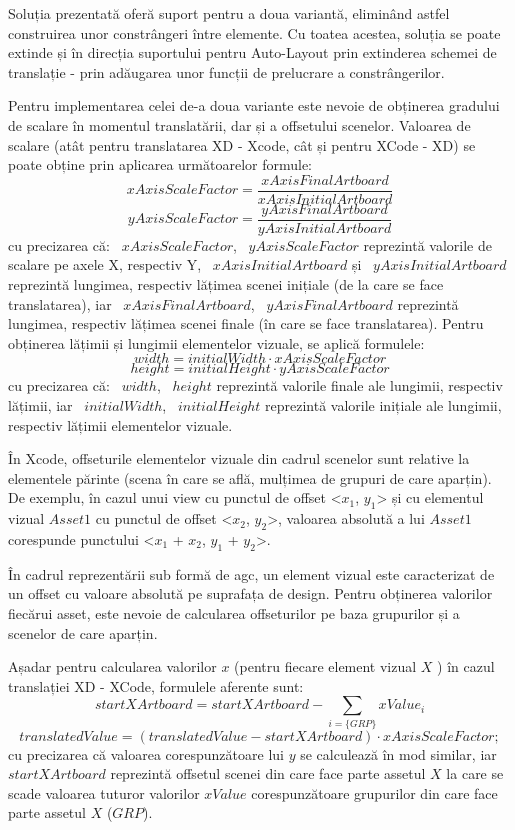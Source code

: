 Soluția prezentată oferă suport pentru a doua variantă, eliminând astfel construirea unor constrângeri între elemente. Cu toatea acestea, soluția se poate extinde și în direcția suportului pentru Auto-Layout prin extinderea schemei de translație - prin adăugarea unor funcții de prelucrare a constrângerilor.

Pentru implementarea celei de-a doua variante este nevoie de obținerea gradului de scalare în momentul translatării, dar și a offsetului scenelor. Valoarea de scalare (atât pentru translatarea XD - Xcode, cât și pentru XCode - XD) se poate obține prin aplicarea următoarelor formule: 
\[ xAxisScaleFactor=\frac{xAxisFinalArtboard}{xAxisInitialArtboard} \]
\[ yAxisScaleFactor=\frac{yAxisFinalArtboard}{yAxisInitialArtboard} \]
cu precizarea că:
 ~$xAxisScaleFactor$, ~$yAxisScaleFactor$ reprezintă valorile de scalare pe axele X, respectiv Y,  ~$xAxisInitialArtboard$ și ~$yAxisInitialArtboard$ reprezintă lungimea, respectiv lățimea scenei inițiale (de la care se face translatarea), iar ~$xAxisFinalArtboard$, ~$yAxisFinalArtboard$ reprezintă lungimea, respectiv lățimea scenei finale (în care se face translatarea).
Pentru obținerea lățimii și lungimii elementelor vizuale, se aplică formulele:
\[ width =  {initialWidth}\cdot{xAxisScaleFactor}\]
\[ height =  {initialHeight}\cdot{yAxisScaleFactor}\]
cu precizarea că:
~$width$, ~$height$ reprezintă valorile finale ale lungimii, respectiv lățimii, iar ~$initialWidth$, ~$initialHeight$ reprezintă valorile inițiale ale lungimii, respectiv lățimii elementelor vizuale.

În Xcode, offseturile elementelor vizuale din cadrul scenelor sunt relative la elementele părinte (scena în care se află, mulțimea de grupuri de care aparțin). De exemplu, în cazul unui view cu punctul de offset <$x_1$, $y_1$> și cu elementul vizual $Asset1$ cu punctul de offset <$x_2$, $y_2$>, valoarea absolută a lui $Asset1$ corespunde punctului <$x_1$ + $x_2$, $y_1$ + $y_2$>. 

În cadrul reprezentării sub formă de agc, un element vizual este caracterizat de un offset cu valoare absolută pe suprafața de design. Pentru obținerea valorilor fiecărui asset, este nevoie de calcularea offseturilor pe baza grupurilor și a scenelor de care aparțin.

Așadar pentru calcularea valorilor $x$ (pentru fiecare element vizual $X$ ) în cazul translației XD - XCode, formulele aferente sunt:
        \[ startXArtboard = startXArtboard - \sum_{i = \{GRP\}} xValue_{i} \]
        \[ translatedValue = (translatedValue - {startXArtboard}) \cdot{xAxisScaleFactor};\]
cu precizarea că valoarea corespunzătoare lui $y$ se calculează în mod similar, iar ~$startXArtboard$ reprezintă offsetul scenei din care face parte assetul $X$ la care se scade valoarea tuturor valorilor $xValue$ corespunzătoare grupurilor din care face parte assetul $X$ ($GRP$). 


